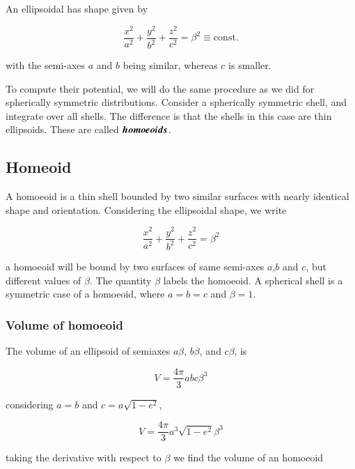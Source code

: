 An ellipsoidal has shape given by

\begin{equation}
\frac{x^2}{a^2} + \frac{y^2}{b^2} + \frac{z^2}{c^2} = \beta^2 \equiv \mathrm{const.}
\end{equation}

with the semi-axes $a$ and $b$ being similar, whereas $c$ is smaller. 



To compute their potential, we will do the same procedure as we did for spherically symmetric distributions. Consider a spherically symmetric shell, and integrate over all shells. The difference is that the shells in this case are thin ellipsoids. These are called ${\boldsymbol{homoeoids}}$.

\subsection{Homeoid}


A homoeoid is a thin shell bounded by two similar surfaces with nearly identical shape and orientation. Considering the ellipsoidal shape, we write  

\begin{equation}
\frac{x^2}{a^2} + \frac{y^2}{b^2} + \frac{z^2}{c^2} = \beta^2
\end{equation}

a homoeoid will be bound by two surfaces of same semi-axes $a$,$b$ and $c$, but different values of $\beta$. The quantity $\beta$ labels the homoeoid. A spherical shell is a symmetric case of a homoeoid, where $a=b=c$ and $\beta=1$.

\subsubsection{Volume of homoeoid}

The volume of an ellipsoid of semiaxes $a\beta$, $b\beta$, and $c\beta$, is  

\begin{equation}
V = \frac{4\pi}{3}abc \beta^3 
\end{equation}

considering $a=b$ and $c=a\sqrt{1-e^2}$,

\begin{equation}
V = \frac{4\pi}{3}a^3 \sqrt{1-e^2} \beta^3 
\end{equation}

taking the derivative with respect to $\beta$ we find the volume of an homoeoid

